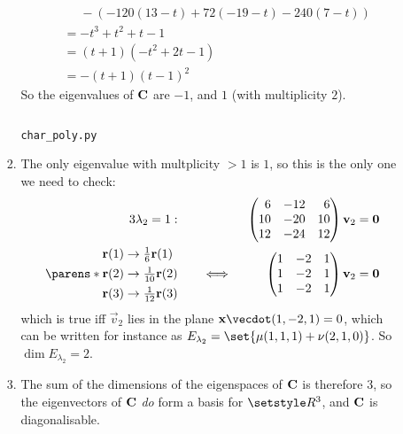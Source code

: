 \documentclass[fleqn,a4paper,11pt]{article}
\begin{document}
\begin{enumerate}[label=\textbf{\arabic*.}]
\begin{enumerate}[label=(\textbf{\Alph*})]
\begin{enumerate}[label=(\roman*)]
\begin{align*}
         &\phantom{={}} - (-120(13 - t) + 72(-19 - t) - 240(7 - t)) \\
         &= -t^3 + t^2 + t - 1 \\
         &= (t + 1)(-t^2 + 2t - 1) \\
         &= -(t + 1)(t - 1)^2
       \end{align*}
       So the eigenvalues of \(\mathbf{C}\) are \(-1\), and \(1\) (with multiplicity
       \(2\)).
       \begin{listing}[H]
        \inputminted{python}{char_poly.py}
        \caption{\texttt{char\_poly.py} \label{listing_py}}
       \end{listing}
      \item
       The only eigenvalue with multplicity \(> 1\) is \(1\), so this is the
       only one we need to check:
       \begin{alignat*}3
        \lambda_2 = 1:\quad
        && &&\begin{pmatrix*}[r]
         6 & -12 & 6 \\
         10 & -20 & 10 \\
         12 & -24 & 12
        \end{pmatrix*}
        \vec v_2 &= \vec 0 \\
        \parens*{
         \begin{aligned}
          \vec r(1) &\to \tfrac 16 \vec r(1) \\
          \vec r(2) &\to \tfrac 1{10} \vec r(2) \\
          \vec r(3) &\to \tfrac 1{12} \vec r(3)
         \end{aligned}
        } \quad
        &&\iff{}&&\begin{pmatrix*}[r]
         1 & -2 & 1 \\
         1 & -2 & 1 \\
         1 & -2 & 1
        \end{pmatrix*}
        \vec v_2 &= \vec 0 \\
       \end{alignat*}
       which is true iff \(\vec v_2\) lies in the plane
       \(\vec x \vecdot (1, -2, 1) = 0\), which can be written for instance as
       \(E_{\lambda_2} = \set{\mu(1, 1, 1) + \nu(2, 1, 0)}\). So
       \(\dim E_{\lambda_2} = 2\).
      \item
       The sum of the dimensions of the eigenspaces of \(\mathbf{C}\) is therefore
       \(3\), so the eigenvectors of \(\mathbf{C}\) \emph{do} form a basis for
       \(\Reals^3\), and \(\mathbf{C}\) is diagonalisable.
     \end{enumerate}

\end{enumerate}
\end{enumerate}
\end{document}
